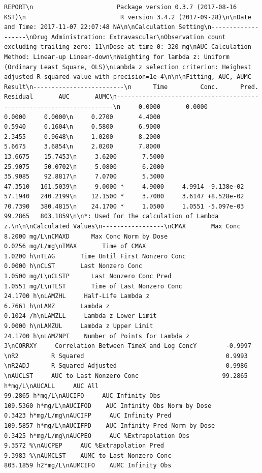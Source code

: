 \documentclass[12pt,]{krantz}
\theoremstyle{definition}
\theoremstyle{definition}
\theoremstyle{definition}
\theoremstyle{remark}
\begin{document}
\begin{verbatim}
REPORT\n                       Package version 0.3.7 (2017-08-16 KST)\n                          R version 3.4.2 (2017-09-28)\n\nDate and Time: 2017-11-07 22:07:48 NA\n\nCalculation Setting\n-------------------\nDrug Administration: Extravascular\nObservation count excluding trailing zero: 11\nDose at time 0: 320 mg\nAUC Calculation Method: Linear-up Linear-down\nWeighting for lambda z: Uniform (Ordinary Least Square, OLS)\nLambda z selection criterion: Heighest adjusted R-squared value with precision=1e-4\n\n\nFitting, AUC, AUMC Result\n-------------------------\n      Time         Conc.      Pred.   Residual       AUC       AUMC\n---------------------------------------------------------------------\n     0.0000       0.0000                           0.0000     0.0000\n     0.2700       4.4000                           0.5940     0.1604\n     0.5800       6.9000                           2.3455     0.9648\n     1.0200       8.2000                           5.6675     3.6854\n     2.0200       7.8000                          13.6675    15.7453\n     3.6200       7.5000                          25.9075    50.0702\n     5.0800       6.2000                          35.9085    92.8817\n     7.0700       5.3000                          47.3510   161.5039\n     9.0000 *     4.9000     4.9914 -9.138e-02    57.1940   240.2199\n    12.1500 *     3.7000     3.6147 +8.528e-02    70.7390   380.4815\n    24.1700 *     1.0500     1.0551 -5.097e-03    99.2865   803.1859\n\n*: Used for the calculation of Lambda z.\n\n\nCalculated Values\n-----------------\nCMAX       Max Conc                                        8.2000 mg/L\nCMAXD      Max Conc Norm by Dose                           0.0256 mg/L/mg\nTMAX       Time of CMAX                                    1.0200 h\nTLAG       Time Until First Nonzero Conc                   0.0000 h\nCLST       Last Nonzero Conc                               1.0500 mg/L\nCLSTP      Last Nonzero Conc Pred                          1.0551 mg/L\nTLST       Time of Last Nonzero Conc                      24.1700 h\nLAMZHL     Half-Life Lambda z                              6.7661 h\nLAMZ       Lambda z                                        0.1024 /h\nLAMZLL     Lambda z Lower Limit                            9.0000 h\nLAMZUL     Lambda z Upper Limit                           24.1700 h\nLAMZNPT    Number of Points for Lambda z                   3\nCORRXY     Correlation Between TimeX and Log ConcY        -0.9997 \nR2         R Squared                                       0.9993 \nR2ADJ      R Squared Adjusted                              0.9986 \nAUCLST     AUC to Last Nonzero Conc                       99.2865 h*mg/L\nAUCALL     AUC All                                        99.2865 h*mg/L\nAUCIFO     AUC Infinity Obs                              109.5360 h*mg/L\nAUCIFOD    AUC Infinity Obs Norm by Dose                   0.3423 h*mg/L/mg\nAUCIFP     AUC Infinity Pred                             109.5857 h*mg/L\nAUCIFPD    AUC Infinity Pred Norm by Dose                  0.3425 h*mg/L/mg\nAUCPEO     AUC %Extrapolation Obs                          9.3572 %\nAUCPEP     AUC %Extrapolation Pred                         9.3983 %\nAUMCLST    AUMC to Last Nonzero Conc                     803.1859 h2*mg/L\nAUMCIFO    AUMC Infinity Obs                    
\end{verbatim}
\end{document}
